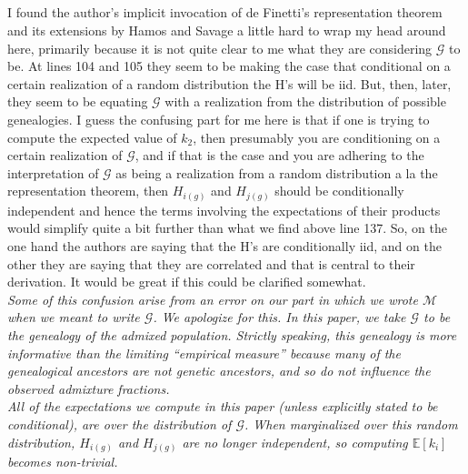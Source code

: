 \documentclass[11pt]{amsart}
\begin{document}
\subsection{} I found the author's implicit invocation of de Finetti's representation theorem and its extensions by Hamos and Savage a little hard to wrap my head around here, primarily because it is not quite clear to me what they are considering $\mathcal{G}$ to be. 
At lines 104 and 105 they seem to be making the case that conditional on a certain realization of a random distribution the H's will be iid. 
But, then, later, they seem to be equating $\mathcal{G}$ with a realization from the distribution of possible genealogies. 
I guess the confusing part for me here is that if one is trying to compute the expected value of $k_2$, then presumably you are conditioning on a certain realization of $\mathcal{G}$, 
and if that is the case and you are adhering to
the interpretation of $\mathcal{G}$ as being a realization from a random distribution a la the representation theorem, 
then $H_{i(g)}$ and $H_{j(g)}$ should be conditionally independent and hence the terms involving the
expectations of their products would simplify quite a bit further than what we find above line 137. 
So, on the one hand the authors are saying that the H's are conditionally iid, and on the other they are saying that they are correlated and that is central to their derivation. 
It would be great if this could be clarified somewhat.\\
\textit{
	\indent
	Some of this confusion arise from an error on our part in which we wrote $\mathcal{M}$ when we meant to write $\mathcal{G}$.
	We apologize for this.
	In this paper, we take $\mathcal{G}$ to be the genealogy of the admixed population.
	Strictly speaking, this genealogy is more informative than the limiting ``empirical measure'' because many of the genealogical ancestors are not genetic ancestors, and so do not influence the observed admixture fractions. \\
	\indent 
	All of the expectations we compute in this paper (unless explicitly stated to be conditional), are over the distribution of $\mathcal{G}$. When marginalized over this random distribution, $H_{i(g)}$ and $H_{j(g)}$ are no longer independent, so computing $\mathbb{E}[k_i]$ becomes non-trivial.
}
\end{document}
